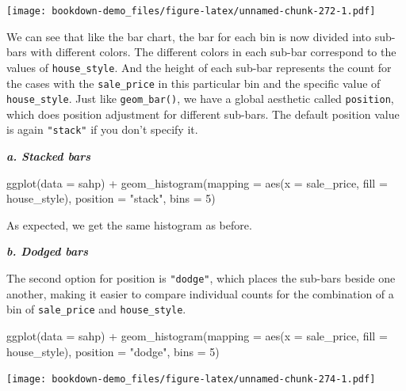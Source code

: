 \documentclass[
]{book}
\newenvironment{Shaded}{\begin{snugshade}}{\end{snugshade}}
\newcommand{\AttributeTok}[1]{\textcolor[rgb]{0.77,0.63,0.00}{#1}}
\newcommand{\DecValTok}[1]{\textcolor[rgb]{0.00,0.00,0.81}{#1}}
\newcommand{\FunctionTok}[1]{\textcolor[rgb]{0.00,0.00,0.00}{#1}}
\newcommand{\NormalTok}[1]{#1}
\newcommand{\SpecialCharTok}[1]{\textcolor[rgb]{0.00,0.00,0.00}{#1}}
\newcommand{\StringTok}[1]{\textcolor[rgb]{0.31,0.60,0.02}{#1}}
\begin{document}
\texttt{[image: bookdown-demo\_files/figure-latex/unnamed-chunk-272-1.pdf]}

We can see that like the bar chart, the bar for each bin is now divided into sub-bars with different colors. The different colors in each sub-bar correspond to the values of \texttt{house\_style}. And the height of each sub-bar represents the count for the cases with the \texttt{sale\_price} in this particular bin and the specific value of \texttt{house\_style}. Just like \texttt{geom\_bar()}, we have a global aesthetic called \texttt{position}, which does position adjustment for different sub-bars. The default position value is again \texttt{"stack"} if you don't specify it.

\textbf{\emph{a. Stacked bars}}

\begin{Shaded}
\begin{Highlighting}[]
\FunctionTok{ggplot}\NormalTok{(}\AttributeTok{data =}\NormalTok{ sahp) }\SpecialCharTok{+} \FunctionTok{geom\_histogram}\NormalTok{(}\AttributeTok{mapping =} \FunctionTok{aes}\NormalTok{(}\AttributeTok{x =}\NormalTok{ sale\_price, }\AttributeTok{fill =}\NormalTok{ house\_style), }\AttributeTok{position =} \StringTok{"stack"}\NormalTok{, }\AttributeTok{bins =} \DecValTok{5}\NormalTok{)}
\end{Highlighting}
\end{Shaded}

As expected, we get the same histogram as before.

\textbf{\emph{b. Dodged bars}}

The second option for position is \texttt{"dodge"}, which places the sub-bars beside one another, making it easier to compare individual counts for the combination of a bin of \texttt{sale\_price} and \texttt{house\_style}.

\begin{Shaded}
\begin{Highlighting}[]
\FunctionTok{ggplot}\NormalTok{(}\AttributeTok{data =}\NormalTok{ sahp) }\SpecialCharTok{+} \FunctionTok{geom\_histogram}\NormalTok{(}\AttributeTok{mapping =} \FunctionTok{aes}\NormalTok{(}\AttributeTok{x =}\NormalTok{ sale\_price, }\AttributeTok{fill =}\NormalTok{ house\_style), }\AttributeTok{position =} \StringTok{"dodge"}\NormalTok{, }\AttributeTok{bins =} \DecValTok{5}\NormalTok{)}
\end{Highlighting}
\end{Shaded}

\texttt{[image: bookdown-demo\_files/figure-latex/unnamed-chunk-274-1.pdf]}
\end{document}

